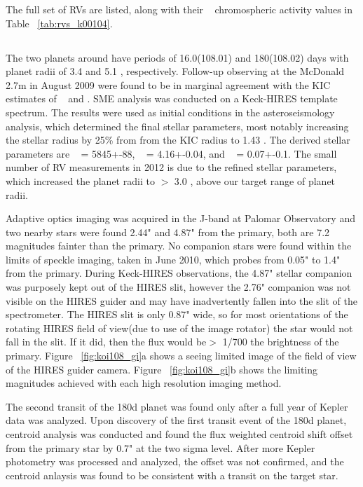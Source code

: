 \documentclass{emulateapj}
\begin{document}
The full set of RVs are listed, along with their \rphk~ chromospheric activity values in Table ~\ref{tab:rvs_k00104}.



\subsection{\koionezeroeight} %

The two planets around {\koionezeroeight} have periods of 16.0(108.01) and 180(108.02) days with planet radii of 3.4 and 5.1 \rearth, respectively. Follow-up observing at the McDonald 2.7m in August 2009 were found to be in marginal agreement with the  KIC estimates of \teff~ and \logg.  SME analysis was conducted on a Keck-HIRES template spectrum. The results were used as initial conditions in the asteroseismology analysis, which determined the final stellar parameters, most notably increasing the stellar radius by  25\% from from the KIC radius to 1.43 \rsune.  The derived stellar parameters are \teff~ = 5845+-88, \logg~ = 4.16+-0.04, and \feh~ = 0.07+-0.1.  The small number of RV measurements in  2012 is due to the refined stellar parameters, which increased the planet radii to $>$ 3.0 \rearthe, above our target range of planet radii. 

Adaptive optics imaging was acquired in the J-band at Palomar Observatory and two nearby stars were found 2.44" and 4.87" from the primary, both are 7.2 magnitudes fainter than the primary. No companion stars were found within the limits of speckle imaging, taken in June 2010, which probes from 0.05" to 1.4" from the primary.  During Keck-HIRES observations, the 4.87"  stellar companion was purposely kept out of the HIRES slit, however the 2.76" companion was not visible on the HIRES guider and may have inadvertently fallen into the slit of the spectrometer.  The HIRES slit is only 0.87" wide, so for most orientations of the rotating HIRES field of view(due to use of the image rotator) the star would not fall in the slit. If it did, then the flux would be$>$ 1/700 the brightness of the primary.  Figure ~\ref{fig:koi108_gi}a shows a seeing limited
 image of the field of view of the HIRES guider camera.  Figure ~\ref{fig:koi108_gi}b shows the limiting magnitudes achieved with each high resolution imaging method.  

The second transit of the 180d planet was found only after a full year of Kepler data was analyzed. Upon discovery of the first transit event of the 180d planet, centroid analysis was conducted and found the flux weighted centroid shift offset from the primary star by 0.7" at the two sigma level. After more Kepler photometry was processed and analyzed, the offset was not confirmed, and the centroid anlaysis was found to be consistent with a transit on the target star.
\end{document}

